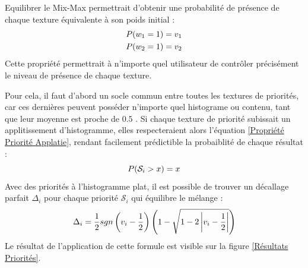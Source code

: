 \documentclass{article}
\begin{document}
Equilibrer le Mix-Max permettrait d'obtenir une probabilité de présence de
chaque texture équivalente à son poids initial :
\begin{equation}\centering\label{Bases Mix Max équilibré}
    \begin{split}
        P(w_1 = 1) &= v_1 \\
        P(w_2 = 1) &= v_2
    \end{split}
\end{equation}
Cette propriété permettrait à n'importe quel utilisateur de contrôler précisément le niveau de présence de chaque texture.

Pour cela, il faut d'abord un socle commun entre toutes les textures de
priorités, car ces dernières peuvent posséder n'importe quel histograme ou
contenu, tant que leur moyenne est proche de $0.5$ \cite{mixmax}. Si chaque
texture de priorité subissait un applitissement d'histogramme, elles
respecteraient alors l'équation \ref{Propriété Priorité Applatie}, rendant
facilement prédictible la probaiblité de chaque résultat :
\begin{equation}\centering\label{Propriété Priorité Applatie}
    P(\mathcal{S}_i > x) = x
\end{equation}
Avec des priorités à l'histogramme plat, il est possible de trouver un décallage parfait $\Delta_i$ pour chaque priorité $\mathcal{S}_i$ qui équilibre le mélange :
\begin{equation}\centering\label{Formule Delta Mix Max Equilibré}
    \Delta_i = \frac{1}{2} sgn \left( v_i-\frac{1}{2} \right)
    \left( 1 - \sqrt{1 - 2 \left| v_i-\frac{1}{2} \right|} \right)
\end{equation}
Le résultat de l'application de cette formule est visible sur la figure \ref{Résultats Priorités}.

\clearpage
\end{document}
